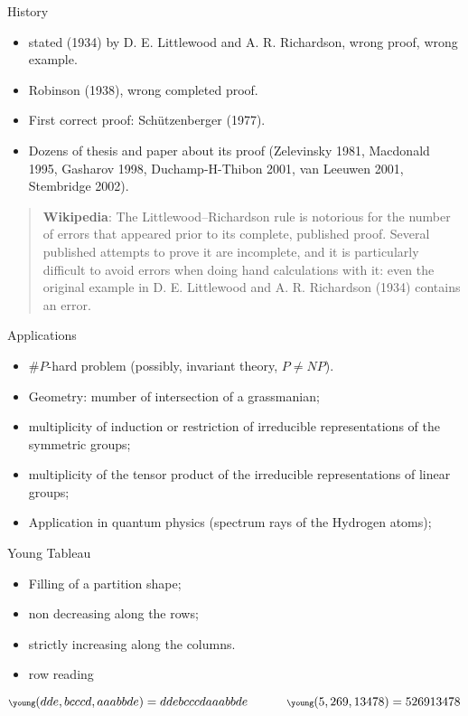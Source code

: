 \documentclass[compress,11pt]{beamer}
\begin{document}
\begin{frame}{History}
  \begin{itemize}
  \item stated (1934) by D. E. Littlewood and A. R. Richardson, wrong proof,
    wrong example.
  \item Robinson (1938), wrong completed proof.
  \item First correct proof: Schützenberger (1977).
  \item Dozens of thesis and paper about its proof (Zelevinsky 1981, Macdonald
    1995, Gasharov 1998, Duchamp-H-Thibon 2001, van Leeuwen 2001, Stembridge
    2002).
  \end{itemize}

  \begin{quotation}\small
    \textbf{Wikipedia}: The Littlewood–Richardson rule is notorious for the
    number of errors that appeared prior to its complete, published
    proof. Several published attempts to prove it are incomplete, and it is
    particularly difficult to avoid errors when doing hand calculations with
    it: even the original example in D. E. Littlewood and A. R. Richardson
    (1934) contains an error.
 \end{quotation}
\end{frame}

\begin{frame}{Applications}
  \begin{itemize}
  \item $\#P$-hard problem (possibly, invariant theory, $P \neq NP$).
  \item Geometry: mumber of intersection of a grassmanian;
  \item multiplicity of induction or restriction of irreducible representations
    of the symmetric groups;
  \item multiplicity of the tensor product of the irreducible representations
    of linear groups;
  \item Application in quantum physics (spectrum rays of the Hydrogen atoms);
  \end{itemize}
\end{frame}

\begin{frame}{Young Tableau}

  \begin{DEFN}
    \begin{itemize}
    \item Filling of a partition shape;
    \item non decreasing along the rows;
    \item strictly increasing along the columns.
      \medskip
    \item row reading
    \end{itemize}
  \end{DEFN}
  \[\scriptsize
  \young(dde,bcccd,aaabbde) = ddebcccdaaabbde
  \qquad\qquad
  \young(5,269,13478)=526913478\]
  
\end{frame}
\end{document}
